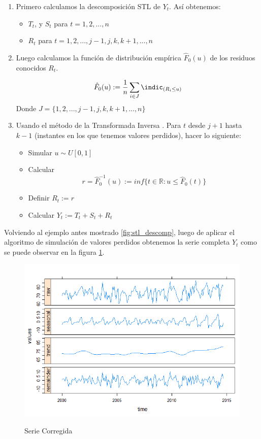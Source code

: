 \documentclass[12pt,oneside]{book}\usepackage[]{graphicx}\usepackage[]{color}
\theoremstyle{definition} %
\begin{document}
\begin{enumerate}
\item Primero calculamos la descomposición STL de $Y_t$. Así obtenemos:
\begin{itemize}
\item $T_t$, y $S_t$ para $t=1,2,...,n$
\item $R_t$ para $t=1,2,...,j-1,j,k,k+1,...,n$
\end{itemize}


\item Luego calculamos la función de distribución empírica $\hat{F}_0(u)$ de los residuos conocidos $R_t$.

$$\hat{F}_0(u):=\frac{1}{n}\sum_{i\in J} \indic_{(R_i\leq u)} $$
Donde $J=\{1,2,...,j-1,j,k,k+1,...,n\}$

\item Usando el método de la Transformada Inversa \cite{ross2006simulation}. Para $t$ desde $j+1$ hasta $k-1$ (instantes en los que tenemos valores perdidos), hacer lo siguiente:

\begin{itemize}
\item Simular $u\sim U[0,1]$
\item Calcular $$r = \hat{F}_0^{-1}(u) := inf\{ t\in \mathbb{R}: u\leq \hat{F}_0(t) \} $$
\item Definir $R_t := r$
\item Calcular $Y_t:=T_t+S_t+R_t$
\end{itemize}

\end{enumerate}


Volviendo al ejemplo antes mostrado \ref{fig:stl_descomp}, luego de aplicar el algoritmo de simulación de valores perdidos obtenemos la serie completa $Y_t$ como se puede observar en la figura \ref{fig:stl_descomp2}.

\begin{figure}[h]
\caption{Serie Corregida}
\includegraphics[width=15cm]{Cap2-MarcoTeorico/Cap2-Stl-Loess2.png}
\label{fig:stl_descomp2}
\centering
\end{figure}
\end{document}
